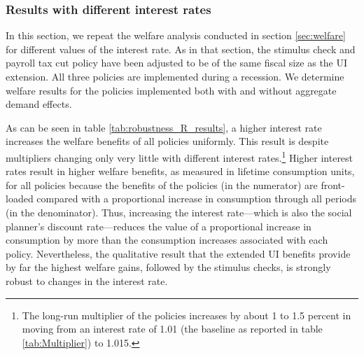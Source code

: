 \documentclass[\econtexRoot/HAFiscal]{subfiles}
\begin{document}
\FloatBarrier
\subsubsection{Results with different interest rates}
\notinsubfile{\label{sec:robust_R_results}}

In this section, we repeat the welfare analysis conducted in section \ref{sec:welfare} for different values of the interest rate. As in that section, the stimulus check and payroll tax cut policy have been adjusted to be of the same fiscal size as the UI extension. All three policies are implemented during a recession. We determine welfare results for the policies implemented both with and without aggregate demand effects.

As can be seen in table \ref{tab:robustness_R_results}, a higher interest rate increases the welfare benefits of all policies uniformly. This result is despite multipliers changing only very little with different interest rates.\footnote{The long-run multiplier of the policies increases by about 1 to 1.5 percent in moving from an interest rate of 1.01 (the baseline as reported in table \ref{tab:Multiplier}) to 1.015.} Higher interest rates result in higher welfare benefits, as measured in lifetime consumption units, for all policies because the benefits of the policies (in the numerator) are front-loaded compared with a proportional increase in consumption through all periods (in the denominator). Thus, increasing the interest rate---which is also the social planner's discount rate---reduces the value of a proportional increase in consumption by more than the consumption increases associated with each policy.  Nevertheless, the qualitative result that the extended UI benefits provide by far the highest welfare gains, followed by the stimulus checks, is strongly robust to changes in the interest rate.
\end{document}
